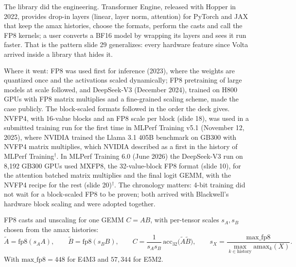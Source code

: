 \documentclass[11pt,letterpaper]{article}
\newenvironment{formulas}{\begin{tcolorbox}[formulabox]}{\end{tcolorbox}}
\begin{document}
The library did the engineering. Transformer Engine, released with Hopper in 2022, provides drop-in layers (linear, layer norm, attention) for PyTorch and JAX that keep the amax histories, choose the formats, perform the casts and call the FP8 kernels; a user converts a BF16 model by wrapping its layers and sees it run faster. That is the pattern slide 29 generalizes: every hardware feature since Volta arrived inside a library that hides it.

Where it went: FP8 was used first for inference (2023), where the weights are quantized once and the activations scaled dynamically; FP8 pretraining of large models at scale followed, and DeepSeek-V3 (December 2024), trained on H800 GPUs with FP8 matrix multiplies and a fine-grained scaling scheme, made the case publicly. The block-scaled formats followed in the order the deck gives. NVFP4, with 16-value blocks and an FP8 scale per block (slide 18), was used in a submitted training run for the first time in MLPerf Training v5.1 (November 12, 2025), where NVIDIA trained the Llama 3.1 405B benchmark on GB300 with NVFP4 matrix multiplies, which NVIDIA described as a first in the history of MLPerf Training$^\dagger$. In MLPerf Training 6.0 (June 2026) the DeepSeek-V3 run on 8{,}192 GB300 GPUs used MXFP8, the 32-value-block FP8 format (slide 10), for the attention batched matrix multiplies and the final logit GEMM, with the NVFP4 recipe for the rest (slide 20)$^\dagger$. The chronology matters: 4-bit training did not wait for a block-scaled FP8 to be proven; both arrived with Blackwell's hardware block scaling and were adopted together.

\begin{formulas}
FP8 casts and unscaling for one GEMM $C = AB$, with per-tensor scales $s_A, s_B$ chosen from the amax histories:
\[
\tilde A = \mathrm{fp8}(s_A A),\qquad \tilde B = \mathrm{fp8}(s_B B),\qquad
C = \frac{1}{s_A s_B}\,\mathrm{acc}_{32}\bigl(\tilde A \tilde B\bigr),\qquad
s_X = \frac{\mathrm{max\_fp8}}{\max_{k\in\text{history}} \mathrm{amax}_k(X)} .
\]
With $\mathrm{max\_fp8}=448$ for E4M3 and $57{,}344$ for E5M2.
\end{formulas}
\end{document}
